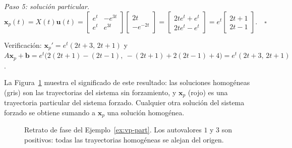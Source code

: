 \begin{example}
\emph{Paso 5: soluci\'on particular.}
\[
\mathbf{x}_p(t) = X(t)\mathbf{u}(t) = \begin{bmatrix} e^t & -e^{3t} \\ e^t & e^{3t} \end{bmatrix} \begin{bmatrix} 2t \\ -e^{-2t} \end{bmatrix}
= \begin{bmatrix} 2te^t + e^t \\ 2te^t - e^t \end{bmatrix}
= e^t \begin{bmatrix} 2t + 1 \\ 2t - 1 \end{bmatrix}. \quad \square
\]
\end{example}

\begin{note}
Verificaci\'on: $\mathbf x_p'=e^t(2t+3,\,2t+1)$ y $A\mathbf x_p+\mathbf b=e^t\big(2(2t+1)-(2t-1),\ -(2t+1)+2(2t-1)+4\big)=e^t(2t+3,\,2t+1)$.
\end{note}

La Figura~\ref{fig:vp-fase} muestra el significado de este resultado: las soluciones homog\'eneas (gris) son las trayectorias del sistema sin forzamiento, y $\mathbf x_p$ (rojo) es una trayectoria particular del sistema forzado. Cualquier otra soluci\'on del sistema forzado se obtiene sumando a $\mathbf x_p$ una soluci\'on homog\'enea.

\begin{figure}[H]
\centering
{}
\caption{Retrato de fase del Ejemplo~\ref{ex:vp-part}. Los autovalores $1$ y $3$ son positivos: todas las trayectorias homog\'eneas se alejan del origen.}
\label{fig:vp-fase}
\end{figure}

